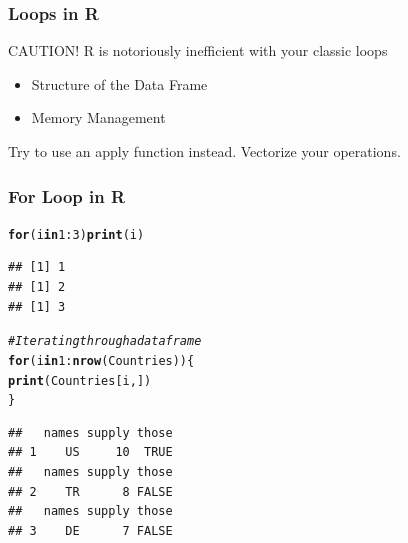 \documentclass{beamer}\usepackage[]{graphicx}\usepackage[]{color}
\makeatletter
\newcommand{\hlnum}[1]{\textcolor[rgb]{0.686,0.059,0.569}{#1}}%
\newcommand{\hlcom}[1]{\textcolor[rgb]{0.678,0.584,0.686}{\textit{#1}}}%
\newcommand{\hlopt}[1]{\textcolor[rgb]{0,0,0}{#1}}%
\newcommand{\hlstd}[1]{\textcolor[rgb]{0.345,0.345,0.345}{#1}}%
\newcommand{\hlkwa}[1]{\textcolor[rgb]{0.161,0.373,0.58}{\textbf{#1}}}%
\newcommand{\hlkwd}[1]{\textcolor[rgb]{0.737,0.353,0.396}{\textbf{#1}}}%
\newenvironment{kframe}{%
 \def\at@end@of@kframe{}%
 \ifinner\ifhmode%
  \def\at@end@of@kframe{\end{minipage}}%
  \begin{minipage}{\columnwidth}%
 \fi\fi%
 \def\FrameCommand##1{\hskip\@totalleftmargin \hskip-\fboxsep
 \colorbox{shadecolor}{##1}\hskip-\fboxsep
     \hskip-\linewidth \hskip-\@totalleftmargin \hskip\columnwidth}%
 \MakeFramed {\advance\hsize-\width
   \@totalleftmargin\z@ \linewidth\hsize
   \@setminipage}}%
 {\par\unskip\endMakeFramed%
 \at@end@of@kframe}
\newenvironment{knitrout}{}{} %
\makeatother
\begin{document}
\begin{frame}
\frametitle{Loops in R}
{\Huge {\color{red} CAUTION!}}
\vfill
R is notoriously inefficient with your classic loops
\vfill

\begin{itemize}
	\item Structure of the Data Frame
	\item Memory Management
\end{itemize}
\vfill
Try to use an apply function instead. 
\vfill
Vectorize your operations.

\end{frame}

\begin{frame}[fragile]
\frametitle{For Loop in R}
\begin{knitrout}\scriptsize
{}\color{fgcolor}\begin{kframe}
\begin{alltt}
\hlkwa{for} \hlstd{(i} \hlkwa{in} \hlnum{1}\hlopt{:}\hlnum{3}\hlstd{)} \hlkwd{print}\hlstd{(i)}
\end{alltt}
\begin{verbatim}
## [1] 1
## [1] 2
## [1] 3
\end{verbatim}
\begin{alltt}
\hlcom{# Iterating through a data frame}
\hlkwa{for} \hlstd{(i} \hlkwa{in} \hlnum{1}\hlopt{:}\hlkwd{nrow}\hlstd{(Countries)) \{}
    \hlkwd{print}\hlstd{(Countries[i, ])}
\hlstd{\}}
\end{alltt}
\begin{verbatim}
##   names supply those
## 1    US     10  TRUE
##   names supply those
## 2    TR      8 FALSE
##   names supply those
## 3    DE      7 FALSE
\end{verbatim}
\end{kframe}
\end{knitrout}

\end{frame}
\end{document}
